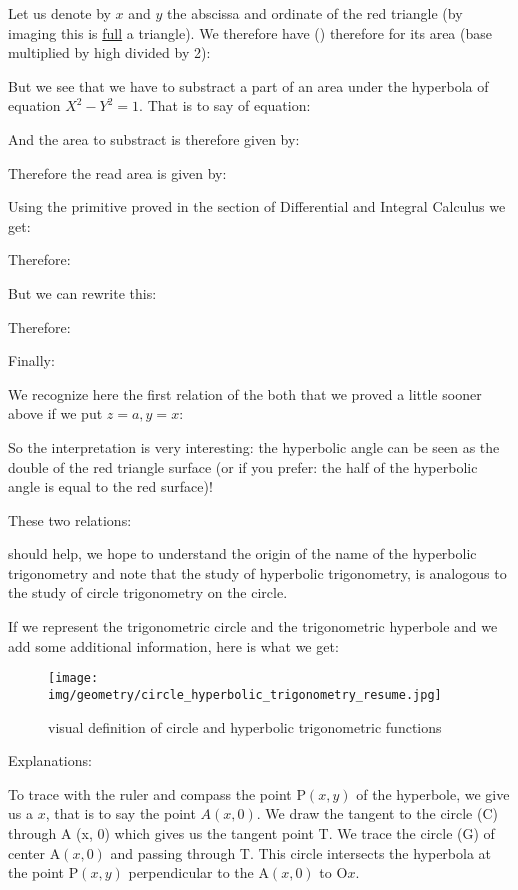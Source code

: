 	Let us denote by $x$ and $y$ the abscissa and ordinate of the red triangle (by imaging this is \underline{full} a triangle). We therefore have () therefore for its area (base multiplied by high divided by 2):
	
	But we see that we have to substract a part of an area under the hyperbola of equation $X^2-Y^2=1$. That is to say of equation:
	
	And the area to substract is therefore given by:
	
	Therefore the read area is given by:
	
	Using the primitive proved in the section of Differential and Integral Calculus we get:
	
	Therefore:
	
	But we can rewrite this:
	
	Therefore:
	
	Finally:
	
	We recognize here the first relation of the both that we proved a little sooner above if we put $z=a,y=x$:

	So the interpretation is very interesting: the hyperbolic angle can be seen as the double of the red triangle surface (or if you prefer: the half of the hyperbolic angle is equal to the red surface)!
	
	These two relations:
	
	
	should help, we hope to understand the origin of the name of the hyperbolic trigonometry and note that the study of hyperbolic trigonometry, is analogous to the study of circle trigonometry on the circle.
	
	If we represent the trigonometric circle and the trigonometric hyperbole and we add some additional information, here is what we get:
	\begin{figure}[H]
	\centering
	\texttt{[image: img/geometry/circle\_hyperbolic\_trigonometry\_resume.jpg]}
	\caption{visual definition of circle and hyperbolic trigonometric functions}
	\end{figure}
	Explanations: 

	To trace with the ruler and compass the point P$(x, y)$ of the hyperbole, we give us a $x$, that is to say the point $A(x, 0)$. We draw the tangent to the circle (C) through A (x, 0) which gives us the tangent point T. We trace the circle (G) of center A$(x, 0)$ and passing through T. This circle intersects the hyperbola at the point P$(x, y)$ perpendicular to the A$(x, 0)$ to $\text{O}x$.
	
